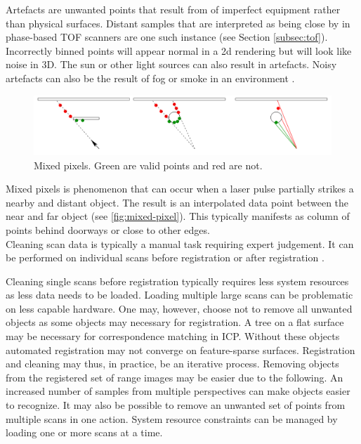Artefacts are unwanted points that result from of imperfect equipment rather than physical surfaces. Distant samples that are interpreted as being close by in phase-based TOF scanners are one such instance (see Section \ref{subsec:tof}). Incorrectly binned points will appear normal in a 2d rendering but will look like noise in 3D. The sun or other light sources can also result in artefacts. Noisy artefacts can also be the result of fog or smoke in an environment \cite{Ruther2011}.


\begin{figure}[ht]
  \centering
  \includegraphics[width=1\linewidth]{images/mixed-pixel}
  \caption{Mixed pixels. Green are valid points and red are not. \cite{Tuley2005}}
  \label{fig:mixed-pixel}
\end{figure}

Mixed pixels is phenomenon that can occur when a laser pulse partially strikes a nearby and distant object. The result is an interpolated data point between the near and far object \cite{Tuley2005} (see \autoref{fig:mixed-pixel}). This typically manifests as column of points behind doorways or close to other edges. \\

Cleaning scan data is typically a manual task requiring expert judgement. It can be performed on individual scans before registration or after registration \cite{Ruther2011}.

Cleaning single scans before registration typically requires less system resources as less data needs to be loaded. Loading multiple large scans can be problematic on less capable hardware. One may, however, choose not to remove all unwanted objects as some objects may necessary for registration. A tree on a flat surface may be necessary for correspondence matching in ICP. Without these objects automated registration may not converge on feature-sparse surfaces. Registration and cleaning may thus, in practice, be an iterative process. Removing objects from the registered set of range images may be easier due to the following. An increased number of samples from multiple perspectives can make objects easier to recognize. It may also be possible to remove an unwanted set of points from multiple scans in one action. System resource constraints can be managed by loading one or more scans at a time.

